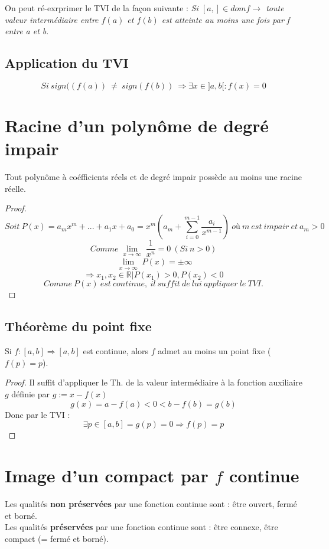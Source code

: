 \documentclass	[11pt, a4paper, openany]{book}
\begin{document}
On peut ré-exrprimer le TVI de la façon suivante : \textit{Si $[a,] \in domf \rightarrow $ toute valeur intermédiaire entre $f(a)$ et $f(b)$ est atteinte au moins une fois par f entre a et b}.
\subsection*{Application du TVI}
$$Si\ sign((f(a))\ \neq\ sign(f(b))\ \Rightarrow \exists x \in ]a, b[ : f(x) = 0$$

\section*{Racine d'un polynôme de degré impair}
Tout polynôme à coéfficients réels et de degré impair possède au moins une racine réelle.

\begin{proof}
$$Soit\ P(x) = a_{m}x^{m} + ... + a_{1}x + a_{0} = x^{m}(a_{m} + \sum_{i=0}^{m-1} \frac{a_{i}}{x^{m-1}})\ où\ m\ est\ impair\ et\ a_{m} > 0$$
$$Comme \lim\limits_{\substack{x \to \infty}} \frac{1}{x^{n}} = 0\ (Si\ n > 0) $$
$$ \lim\limits_{\substack{x \to \infty}} P(x) = \pm \infty$$
$$ \Rightarrow x_{1}, x_{2} \in \mathbb{R} | P(x_{1}) > 0, P(x_{2}) < 0$$
$$Comme\ P(x)\ est\ continue,\ il\ suffit\ de\ lui\ appliquer\ le\ TVI.$$
\end{proof}

\subsection{Théorème du point fixe}
Si $f: [a,b] \Longrightarrow [a,b]$ est continue, alors $f$ admet au moins un point fixe ($f(p) = p$).\\
\begin{proof}
Il suffit d'appliquer le Th. de la valeur intermédiaire à la fonction auxiliaire $g$ définie par $g := x-f(x)$
$$g(x) = a - f(a) < 0 < b - f(b) = g(b)$$
Donc par le TVI : $$\exists p \in [a,b] = g(p) = 0 \Rightarrow f(p) = p$$
\end{proof}

\section{Image d'un compact par $f$ continue}
Les qualités \textbf{non préservées} par une fonction continue sont : être ouvert, fermé et borné.\\
Les qualités \textbf{préservées} par une fonction continue sont : être connexe, être compact (= fermé et borné).
\end{document}

